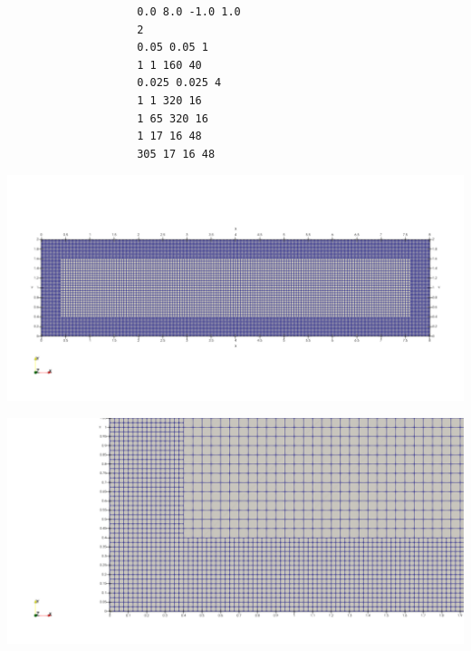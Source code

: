 \documentclass[../main/main.tex]{subfiles}
\begin{document}
\begin{frame}[fragile]{}
	\vspace{-0.5cm}
	\begin{center}
		\begin{minipage}{0.30\textwidth}
			{\footnotesize
				\begin{verbatim}
					0.0 8.0 -1.0 1.0
					2
					0.05 0.05 1
					1 1 160 40
					0.025 0.025 4
					1 1 320 16
					1 65 320 16
					1 17 16 48
					305 17 16 48
				\end{verbatim}
			}
		\end{minipage}
		\hfill
		\begin{minipage}{0.65\textwidth}
			\includegraphics[width=\textwidth]{imgs/ref2.png}
			
			\includegraphics[height=0.3\textheight]{imgs/ref2_border.png}
		\end{minipage}
	\end{center}
\end{frame}
\end{document}
